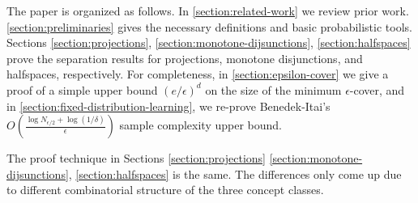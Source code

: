 The paper is organized as follows. In \autoref{section:related-work} we review
prior work. \autoref{section:preliminaries} gives the necessary definitions and
basic probabilistic tools. Sections \ref{section:projections},
\ref{section:monotone-dijsunctions}, \ref{section:halfspaces} prove the
separation results for projections, monotone disjunctions, and halfspaces,
respectively. For completeness, in \autoref{section:epsilon-cover} we give a
proof of a simple upper bound $(e/\epsilon)^d$ on the size of the minimum
$\epsilon$-cover, and in \autoref{section:fixed-distribution-learning}, we re-prove
Benedek-Itai's $O \left( \frac{\log N_{\epsilon/2} + \log
(1/\delta)}{\epsilon}\right)$ sample complexity upper bound.

The proof technique in Sections \ref{section:projections}
\ref{section:monotone-dijsunctions}, \ref{section:halfspaces} is the same. The
differences only come up due to different combinatorial structure of the
three concept classes.
